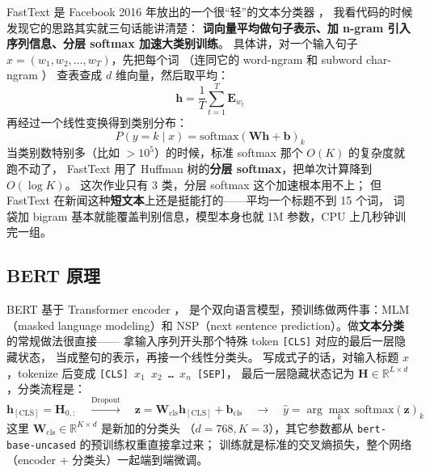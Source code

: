 \documentclass{SYSUReport}
\begin{document}
FastText 是 Facebook 2016 年放出的一个很“轻”的文本分类器 \cite{joulin2017fasttext}，
我看代码的时候发现它的思路其实就三句话能讲清楚：
\textbf{词向量平均做句子表示、加 n-gram 引入序列信息、分层 softmax 加速大类别训练}。
具体讲，对一个输入句子 $x = (w_1, w_2, \ldots, w_T)$，先把每个词
（连同它的 word-ngram 和 subword char-ngram \cite{bojanowski2017enriching}）
查表查成 $d$ 维向量，然后取平均：
\begin{equation}
    \mathbf{h} = \frac{1}{T} \sum_{t=1}^{T} \mathbf{E}_{w_t}
    \label{eq:ft-pool}
\end{equation}
再经过一个线性变换得到类别分布：
\begin{equation}
    P(y=k \mid x) = \mathrm{softmax}\left(\mathbf{W} \mathbf{h} + \mathbf{b}\right)_k
    \label{eq:ft-softmax}
\end{equation}
当类别数特别多（比如 $> 10^5$）的时候，标准 softmax 那个 $O(K)$ 的复杂度就跑不动了，
FastText 用了 Huffman 树的\textbf{分层 softmax}，把单次计算降到 $O(\log K)$。
这次作业只有 3 类，分层 softmax 这个加速根本用不上；
但 FastText 在新闻这种\textbf{短文本}上还是挺能打的——平均一个标题不到 15 个词，
词袋加 bigram 基本就能覆盖判别信息，模型本身也就 1M 参数，CPU 上几秒钟训完一组。

\subsection{BERT 原理}

BERT \cite{devlin2019bert} 基于 Transformer encoder \cite{vaswani2017attention}，
是个双向语言模型，预训练做两件事：MLM（masked language modeling）和
NSP（next sentence prediction）。做\textbf{文本分类}的常规做法很直接——
拿输入序列开头那个特殊 token \texttt{[CLS]} 对应的最后一层隐藏状态，
当成整句的表示，再接一个线性分类头。
写成式子的话，对输入标题 $x$，tokenize 后变成 \texttt{[CLS]\,$x_1$\,$x_2$\,\ldots\,$x_n$\,[SEP]}，
最后一层隐藏状态记为 $\mathbf{H} \in \mathbb{R}^{L \times d}$，分类流程是：
\begin{equation}
    \mathbf{h}_{\mathrm{[CLS]}} = \mathbf{H}_{0,:}
    \quad\xrightarrow{\text{Dropout}}\quad
    \mathbf{z} = \mathbf{W}_\mathrm{cls} \mathbf{h}_{\mathrm{[CLS]}} + \mathbf{b}_\mathrm{cls}
    \quad\xrightarrow{}\quad
    \hat{y} = \arg\max_k\, \mathrm{softmax}(\mathbf{z})_k
    \label{eq:bert-cls}
\end{equation}
这里 $\mathbf{W}_\mathrm{cls} \in \mathbb{R}^{K \times d}$ 是新加的分类头
（$d=768, K=3$），其它参数都从 \texttt{bert-base-uncased} 的预训练权重直接拿过来；
训练就是标准的交叉熵损失，整个网络（encoder + 分类头）一起端到端微调。
\end{document}
